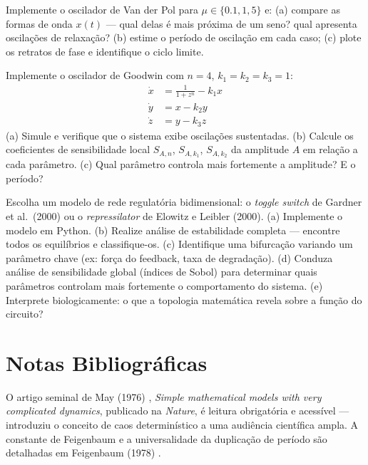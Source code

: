 \begin{exercicio}
Implemente o oscilador de Van der Pol para $\mu \in \{0.1, 1, 5\}$ e: (a) compare as
formas de onda $x(t)$ --- qual delas é mais próxima de um seno? qual apresenta
oscilações de relaxação? (b) estime o período de oscilação em cada caso; (c) plote os
retratos de fase e identifique o ciclo limite.
\end{exercicio}

\begin{exercicio}
Implemente o oscilador de Goodwin com $n = 4$, $k_1 = k_2 = k_3 = 1$:
\begin{align*}
  \dot{x} &= \frac{1}{1+z^n} - k_1 x \\
  \dot{y} &= x - k_2 y \\
  \dot{z} &= y - k_3 z
\end{align*}
(a) Simule e verifique que o sistema exibe oscilações sustentadas. (b) Calcule os
coeficientes de sensibilidade local $S_{A, n}$, $S_{A, k_1}$, $S_{A, k_2}$ da amplitude
$A$ em relação a cada parâmetro. (c) Qual parâmetro controla mais fortemente a amplitude?
E o período?
\end{exercicio}

\begin{exercicio}
Escolha um modelo de rede regulatória bidimensional: o \emph{toggle switch} de Gardner
et al.\ (2000) ou o \emph{repressilator} de Elowitz e Leibler (2000).
(a) Implemente o modelo em Python. (b) Realize análise de estabilidade completa --- encontre
todos os equilíbrios e classifique-os. (c) Identifique uma bifurcação variando um parâmetro
chave (ex: força do feedback, taxa de degradação). (d) Conduza análise de sensibilidade
global (índices de Sobol) para determinar quais parâmetros controlam mais fortemente o
comportamento do sistema. (e) Interprete biologicamente: o que a topologia matemática
revela sobre a função do circuito?
\end{exercicio}

\section{Notas Bibliográficas}

O artigo seminal de May (1976) \cite{may1976}, \textit{Simple mathematical models with very
complicated dynamics}, publicado na \textit{Nature}, é leitura obrigatória e acessível ---
introduziu o conceito de caos determinístico a uma audiência científica ampla. A constante
de Feigenbaum e a universalidade da duplicação de período são detalhadas em Feigenbaum
(1978) \cite{feigenbaum1978}.


